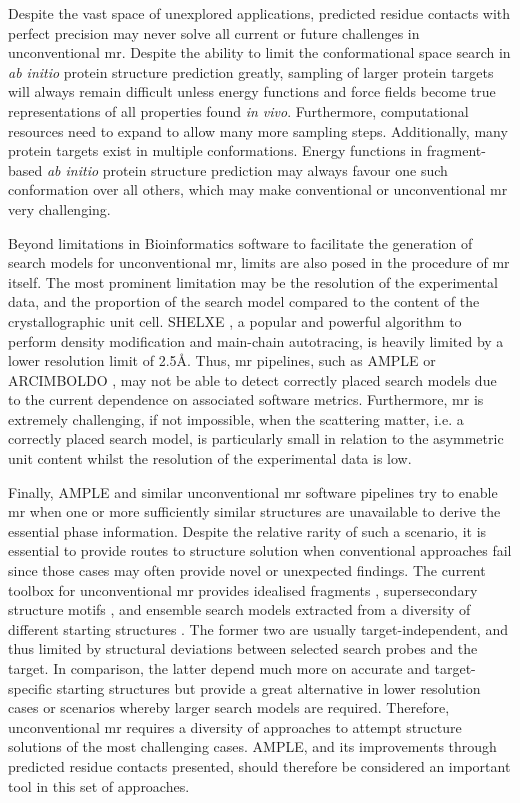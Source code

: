 Despite the vast space of unexplored applications, predicted residue contacts with perfect precision may never solve all current or future challenges in unconventional \gls{mr}. Despite the ability to limit the conformational space search in \textit{ab initio} protein structure prediction greatly, sampling of larger protein targets will always remain difficult unless energy functions and force fields become true representations of all properties found \textit{in vivo}. Furthermore, computational resources need to expand to allow many more sampling steps. Additionally, many protein targets exist in multiple conformations. Energy functions in fragment-based \textit{ab initio} protein structure prediction may always favour one such conformation over all others, which may make conventional or unconventional \gls{mr} very challenging. 

Beyond limitations in Bioinformatics software to facilitate the generation of search models for unconventional \gls{mr}, limits are also posed in the procedure of \gls{mr} itself. The most prominent limitation may be the resolution of the experimental data, and the proportion of the search model compared to the content of the crystallographic unit cell. SHELXE \cite{Thorn2013-le}, a popular and powerful algorithm to perform density modification and main-chain autotracing, is heavily limited by a lower resolution limit of 2.5\AA. Thus, \gls{mr} pipelines, such as AMPLE \cite{Bibby2012-lm} or ARCIMBOLDO \cite{Sammito2015-dv}, may not be able to detect correctly placed search models due to the current dependence on associated software metrics. Furthermore, \gls{mr} is extremely challenging, if not impossible, when the scattering matter, i.e. a correctly placed search model, is particularly small in relation to the asymmetric unit content whilst the resolution of the experimental data is low. 

Finally, AMPLE and similar unconventional \gls{mr} software pipelines try to enable \gls{mr} when one or more sufficiently similar structures are unavailable to derive the essential phase information. Despite the relative rarity of such a scenario, it is essential to provide routes to structure solution when conventional approaches fail since those cases may often provide novel or unexpected findings. The current toolbox for unconventional \gls{mr} provides idealised fragments \cite{Sammito2015-dv,Thomas2015-wu,Jenkins2018-gf}, supersecondary structure motifs \cite{Sammito2013-ug}, and ensemble search models extracted from a diversity of different starting structures \cite{Rigden2018-zt,Bibby2012-lm,Bibby2013-cp}. The former two are usually target-independent, and thus limited by structural deviations between selected search probes and the target. In comparison, the latter depend much more on accurate and target-specific starting structures but provide a great alternative in lower resolution cases or scenarios whereby larger search models are required. Therefore, unconventional \gls{mr} requires a diversity of approaches to attempt structure solutions of the most challenging cases. AMPLE, and its improvements through predicted residue contacts presented, should therefore be considered an important tool in this set of approaches.
